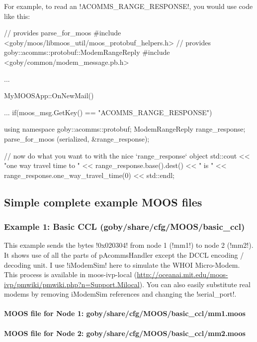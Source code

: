 For example, to read an !ACOMMS_RANGE_RESPONSE!, you would use code like this:
\begin{boxedverbatim}
// provides parse_for_moos
#include <goby/moos/libmoos_util/moos_protobuf_helpers.h>
// provides goby::acomms::protobuf::ModemRangeReply
#include <goby/common/modem_message.pb.h>

...

MyMOOSApp::OnNewMail()
{
  ...
  if(moos_msg.GetKey() == "ACOMMS_RANGE_RESPONSE")
  {
    using namespace goby::acomms::protobuf;
    ModemRangeReply range_response;
    parse_for_moos (serialized, &range_response);
    
    // now do what you want to with the nice `range_response` object
    std::cout << "one way travel time to " << range_response.base().dest() 
              << " is " << range_response.one_way_travel_time(0) << std::endl;
  }
}
\end{boxedverbatim}
\resetbvlinenumber

\subsection{Simple complete example MOOS files}

\subsubsection{Example 1: Basic CCL (goby/share/cfg/MOOS/basic\_ccl)}\label{sec:moos_example_1}
This example sends the bytes !0x020304! from node 1 (!mm1!) to node 2 (!mm2!). It shows use of all the parts of pAcommsHandler except the DCCL encoding / decoding unit. I use !iModemSim! here to simulate the WHOI Micro-Modem. This process is available in moos-ivp-local (\url{http://oceanai.mit.edu/moos-ivp/pmwiki/pmwiki.php?n=Support.Milocal}). You can also easily substitute real modems by removing iModemSim references and changing the !serial_port!.

\paragraph{MOOS file for Node 1: goby/share/cfg/MOOS/basic\_ccl/mm1.moos}
\resetbvlinenumber

\paragraph{MOOS file for Node 2: goby/share/cfg/MOOS/basic\_ccl/mm2.moos}
\resetbvlinenumber

